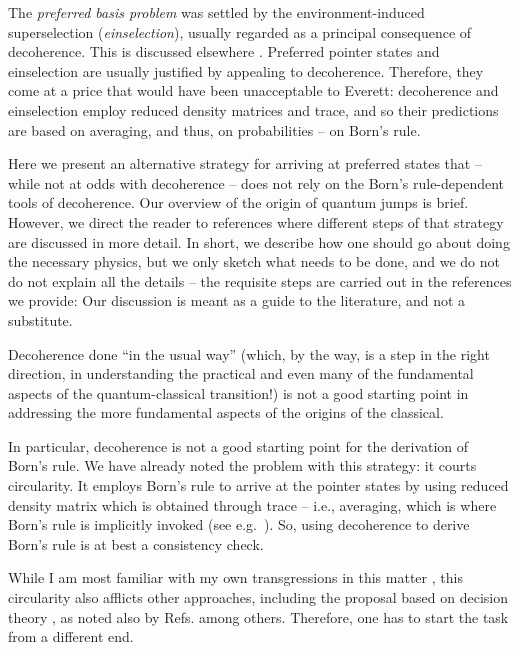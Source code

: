\documentclass[aps,amsmath,amssymb,amsfonts,floatfix]{revtex4-1}
\newcommand{\+}         {\dagger}
\begin{document}
The {\it preferred basis problem} was settled by the environment-induced superselection ({\it einselection}), 
usually regarded as a principal consequence of decoherence. This is discussed elsewhere \cite{69,70}.
Preferred pointer states and einselection are usually justified by appealing to decoherence. Therefore,
they come at a price that would have been unacceptable to Everett: decoherence and einselection
employ reduced density matrices and trace, and so their predictions are based on averaging, and thus, on probabilities -- on Born's rule.

Here we present an alternative strategy for arriving at preferred states that -- while not at odds with decoherence -- does not rely on the Born's rule-dependent tools of decoherence. Our overview of the origin of quantum jumps is brief. However, we direct the reader to references where different steps of that strategy are discussed in more detail. In short, we describe how one should go about doing the necessary physics, but we only sketch what needs to be done, and we do not do not explain all the details -- the requisite steps are carried out in the references we provide: Our discussion is meant as a guide to the literature, and not a substitute.

Decoherence done ``in the usual way'' (which, by the way, is a step in the right direction, in
understanding the practical and even many of the fundamental aspects of the quantum-classical
transition!) is not a good starting point in addressing the more fundamental aspects of the origins
of the classical. 

In particular, decoherence is not a good starting point for the derivation of Born's rule.
We have already noted the problem with this strategy: it courts circularity.
It employs Born's rule to arrive at the pointer states by using reduced density matrix which is obtained through trace -- i.e., averaging, which is where Born's rule is implicitly invoked (see e.g.~\cite{NC}). So, using decoherence to derive Born's rule is at best a consistency check. 

While I am most familiar with my own transgressions in this matter \cite{74}, this circularity also afflicts other approaches, including the proposal based on decision theory \cite{19,61,50}, as noted also by Refs. \cite{29,Synthese} among others. Therefore, one has to start the task from a different end. 
\end{document}
